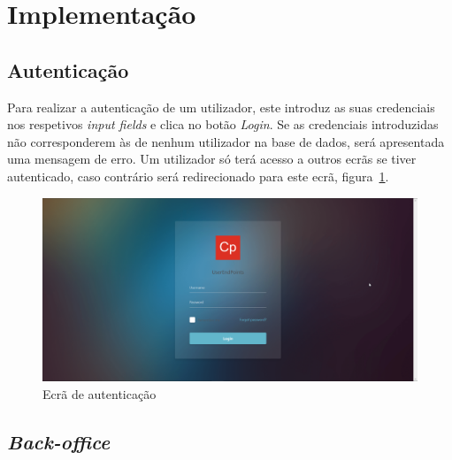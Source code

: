 \section{Implementação}\label{sec:implementacao}

\subsection{Autenticação}\label{subsec:implementacao:login}

Para realizar a autenticação de um utilizador, este introduz as suas credenciais nos respetivos \textit{input fields} e clica no botão \textit{Login}.
Se as credenciais introduzidas não corresponderem às de nenhum utilizador na base de dados, será apresentada uma mensagem de erro.
Um utilizador só terá acesso a outros ecrãs se tiver autenticado, caso contrário será redirecionado para este ecrã, figura~\ref{fig:LoginScreen}.

\begin{figure}[H]
  \centering 
  \includegraphics[scale=0.35]{figures/LoginScreen.png}
  \caption{Ecrã de autenticação}\label{fig:LoginScreen}
\end{figure}

\subsection{\textit{Back-office}}\label{subsec:implementacao:back-office}

